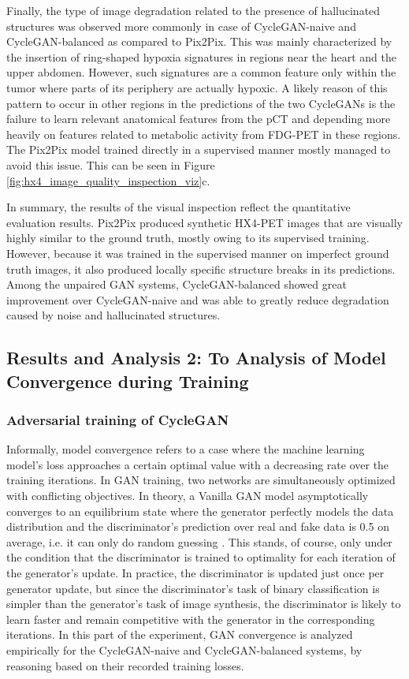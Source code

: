 Finally, the type of image degradation related to the presence of hallucinated structures was observed more commonly in case of CycleGAN-naive and CycleGAN-balanced as compared to Pix2Pix. This was mainly characterized by the insertion of ring-shaped hypoxia signatures in regions near the heart and the upper abdomen. However, such signatures are a common feature only within the tumor where parts of its periphery are actually hypoxic. A likely reason of this pattern to occur in other regions in the predictions of the two CycleGANs is the failure to learn relevant anatomical features from the pCT and depending more heavily on features related to metabolic activity from FDG-PET in these regions. The Pix2Pix model trained directly in a supervised manner mostly managed to avoid this issue. This can be seen in Figure \ref{fig:hx4_image_quality_inspection_viz}c.

In summary, the results of the visual inspection reflect the quantitative evaluation results. Pix2Pix produced synthetic HX4-PET images that are visually highly similar to the ground truth, mostly owing to its supervised training. However, because it was trained in the supervised manner on imperfect ground truth images, it also produced locally specific structure breaks in its predictions. Among the unpaired GAN systems, CycleGAN-balanced showed great improvement over CycleGAN-naive and was able to greatly reduce degradation caused by noise and hallucinated structures.


\subsection{Results and Analysis 2: To Analysis of Model Convergence during Training}
\subsubsection{Adversarial training of CycleGAN} 
Informally, model convergence refers to a case where the machine learning model's loss approaches a certain optimal value with a decreasing rate over the training iterations. In GAN training, two networks are simultaneously optimized with conflicting objectives. In theory, a Vanilla GAN model asymptotically converges to an equilibrium state where the generator perfectly models the data distribution and the discriminator's prediction over real and fake data is 0.5 on average, i.e. it can only do random guessing \cite{goodfellow2014generative}. This stands, of course, only under the condition that the discriminator is trained to optimality for each iteration of the generator's update. In practice, the discriminator is updated just once per generator update, but since the discriminator's task of binary classification is simpler than the generator's task of image synthesis, the discriminator is likely to learn faster and remain competitive with the generator in the corresponding iterations. In this part of the experiment, GAN convergence is analyzed empirically for the CycleGAN-naive and CycleGAN-balanced systems, by reasoning based on their recorded training losses.

